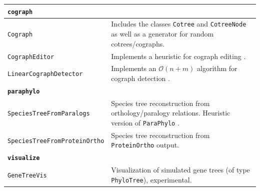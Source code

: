 \documentclass[hidelinks,11pt]{article}
\begin{document}
{\begin{longtable}{| p{4.0cm} | p{10cm} |}
	\hline
	\multicolumn{2}{|l|}{\textbf{\texttt{cograph}}}\\
	\hline
	\texttt{Cograph} &
	Includes the classes \texttt{Cotree} and \texttt{CotreeNode} as well as a generator for random cotrees/cographs. \\
	\texttt{CographEditor} &
	Implements a heuristic for cograph editing \citep{crespelle2019}. \\
	\texttt{LinearCographDetector} &
	Implements an $\mathcal{O}(n+m)$ algorithm for cograph detection \citep{corneil1985}. \\
	\hline
	\multicolumn{2}{|l|}{\textbf{\texttt{paraphylo}}}\\
	\hline
	\texttt{SpeciesTreeFromParalogs} &
	Species tree reconstruction from orthology/paralogy relations. Heuristic version of \texttt{ParaPhylo} \cite{hellmuth2015}. \\
	\texttt{SpeciesTreeFrom\newline ProteinOrtho} &
	Species tree reconstruction from \texttt{ProteinOrtho} \cite{lechner2011,lechner2014} output. \\
	\hline
	\multicolumn{2}{|l|}{\textbf{\texttt{visualize}}}\\
	\hline
	\texttt{GeneTreeVis} &
	Visualization of simulated gene trees (of type \texttt{PhyloTree}), experimental. \\
\end{longtable}
}
\end{document}
